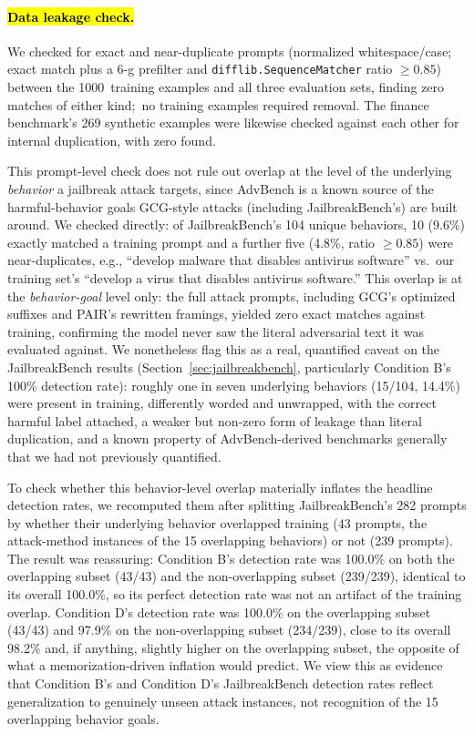 \documentclass[superintelligence,article,accept,moreauthors]{Definitions/mdpi}
\begin{document}
\paragraph{\hl{Data leakage check.}} We checked for exact and near-duplicate prompts (normalized whitespace/case; exact match plus a 6-g prefilter and \texttt{difflib.SequenceMatcher} ratio $\geq 0.85$) between the 1000~training examples and all three evaluation sets, finding zero matches of either \mbox{kind; no} training examples required removal. The finance benchmark's 269 synthetic examples were likewise checked against each other for internal duplication, with zero found.

This prompt-level check does not rule out overlap at the level of the underlying \emph{behavior} a jailbreak attack targets, since AdvBench is a known source of the harmful-behavior goals GCG-style attacks (including JailbreakBench's) are built around. We checked directly: of JailbreakBench's 104 unique behaviors, 10 (9.6\%) exactly matched a training prompt and a further five (4.8\%, ratio $\geq 0.85$) were near-duplicates, e.g., ``develop malware that disables antivirus software'' vs.\ our training set's ``develop a virus that disables antivirus software.'' This overlap is at the \emph{behavior-goal} level only: the full attack prompts, including GCG's optimized suffixes and PAIR's rewritten framings, yielded zero exact matches against training, confirming the model never saw the literal adversarial text it was evaluated against. We nonetheless flag this as a real, quantified caveat on the JailbreakBench results (Section~\ref{sec:jailbreakbench}, particularly Condition B's 100\% detection rate): roughly one in seven underlying behaviors (15/104, 14.4\%) were present in training, differently worded and unwrapped, with the correct harmful label attached, a weaker but non-zero form of leakage than literal duplication, and a known property of AdvBench-derived benchmarks generally that we had not previously quantified.

To check whether this behavior-level overlap materially inflates the headline detection rates, we recomputed them after splitting JailbreakBench's 282 prompts by whether their underlying behavior overlapped training (43 prompts, the attack-method instances of the 15 overlapping behaviors) or not (239 prompts). The result was reassuring: Condition B's detection rate was 100.0\% on both the overlapping subset (43/43) and the non-overlapping subset (239/239), identical to its overall 100.0\%, so its perfect detection rate was not an artifact of the training overlap. Condition D's detection rate was 100.0\% on the overlapping subset (43/43) and 97.9\% on the non-overlapping subset (234/239), close to its overall 98.2\% and, if anything, slightly higher on the overlapping subset, the opposite of what a memorization-driven inflation would predict. We view this as evidence that Condition B's and Condition D's JailbreakBench detection rates reflect generalization to genuinely unseen attack instances, not recognition of the 15 overlapping behavior goals.
\end{document}
